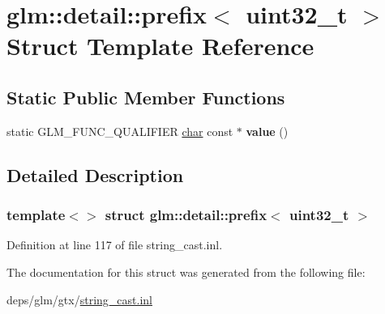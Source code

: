 \hypertarget{structglm_1_1detail_1_1prefix_3_01uint32__t_01_4}{}\section{glm\+:\+:detail\+:\+:prefix$<$ uint32\+\_\+t $>$ Struct Template Reference}
\label{structglm_1_1detail_1_1prefix_3_01uint32__t_01_4}
\subsection*{Static Public Member Functions}
\begin{DoxyCompactItemize}
\item 
\mbox{\label{structglm_1_1detail_1_1prefix_3_01uint32__t_01_4_a8a36d8e3a869d300408dde031429352e}} 
static G\+L\+M\+\_\+\+F\+U\+N\+C\+\_\+\+Q\+U\+A\+L\+I\+F\+I\+ER \hyperlink{classchar}{char} const  $\ast$ {\bfseries value} ()
\end{DoxyCompactItemize}


\subsection{Detailed Description}
\subsubsection*{template$<$$>$\newline
struct glm\+::detail\+::prefix$<$ uint32\+\_\+t $>$}



Definition at line 117 of file string\+\_\+cast.\+inl.



The documentation for this struct was generated from the following file\+:\begin{DoxyCompactItemize}
\item 
deps/glm/gtx/\hyperlink{string__cast_8inl}{string\+\_\+cast.\+inl}\end{DoxyCompactItemize}
